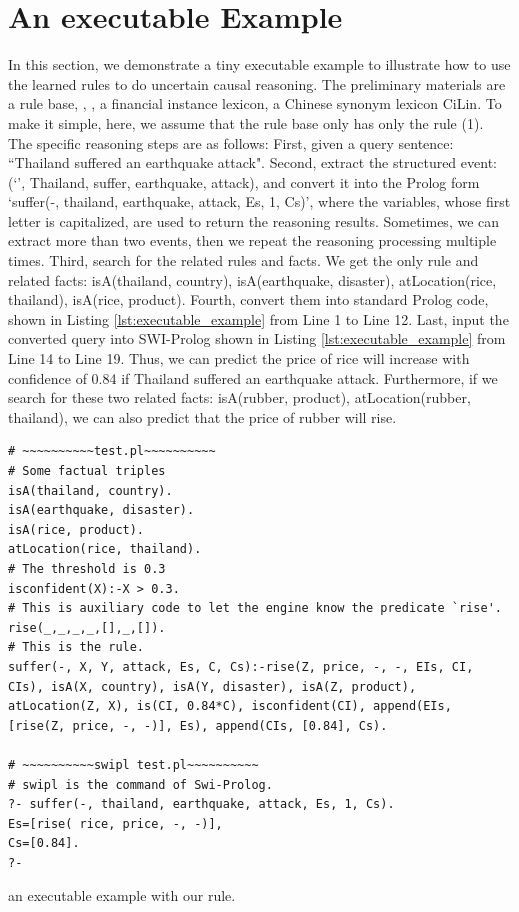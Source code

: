 \section{An executable Example}
\label{sec:executable_example}
In this section, we demonstrate a tiny executable example to illustrate how to use the learned rules to do uncertain causal reasoning. 
The preliminary materials are a rule base, \zhpro, \zhcon, a financial instance lexicon, a Chinese synonym lexicon CiLin. 
To make it simple, here, we assume that the rule base only has only the rule (1).
The specific reasoning steps are as follows:
First, given a query sentence: ``Thailand suffered an earthquake attack". 
Second, extract the structured event: (`', Thailand, suffer, earthquake, attack), and convert it into the Prolog form `suffer(-, thailand, earthquake, attack, Es, 1, Cs)', where the variables, whose first letter is capitalized, are used to return the reasoning results. Sometimes, we can extract more than two events, then we repeat the reasoning processing multiple times. 
Third, search for the related rules and facts. We get the only rule and related facts: isA(thailand, country), isA(earthquake, disaster), atLocation(rice, thailand), isA(rice, product).
Fourth, convert them into standard Prolog code, shown in Listing \ref{lst:executable_example} from Line 1 to Line 12.
Last, input the converted query into SWI-Prolog shown in Listing \ref{lst:executable_example} from Line 14 to Line 19.
Thus, we can predict the price of rice will increase with confidence of 0.84 if Thailand suffered an earthquake attack.
Furthermore, if we search for these two related facts: isA(rubber, product), 
atLocation(rubber, thailand), we can also predict that the price of rubber will rise.
\begin{listing}[htbp]
\begin{verbatim}
# ~~~~~~~~~~test.pl~~~~~~~~~~
# Some factual triples
isA(thailand, country).
isA(earthquake, disaster).
isA(rice, product).
atLocation(rice, thailand).
# The threshold is 0.3
isconfident(X):-X > 0.3. 
# This is auxiliary code to let the engine know the predicate `rise'.
rise(_,_,_,_,[],_,[]).
# This is the rule.
suffer(-, X, Y, attack, Es, C, Cs):-rise(Z, price, -, -, EIs, CI, CIs), isA(X, country), isA(Y, disaster), isA(Z, product), atLocation(Z, X), is(CI, 0.84*C), isconfident(CI), append(EIs, [rise(Z, price, -, -)], Es), append(CIs, [0.84], Cs).

# ~~~~~~~~~~swipl test.pl~~~~~~~~~~
# swipl is the command of Swi-Prolog.
?- suffer(-, thailand, earthquake, attack, Es, 1, Cs).
Es=[rise( rice, price, -, -)],
Cs=[0.84].
?-
\end{verbatim}
\caption{an executable example with our rule.}
\label{lst:executable_example}
\end{listing}

